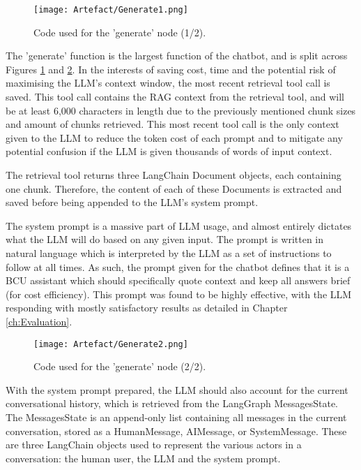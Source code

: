 \begin{figure}[H]
    \centering
    \texttt{[image: Artefact/Generate1.png]}
    \caption{Code used for the 'generate' node (1/2). \label{fig:Generate1}}
\end{figure}

\noindent The 'generate' function is the largest function of the chatbot, and is split across 
Figures \ref{fig:Generate1} and \ref{fig:Generate2}. In the interests of saving 
cost, time and the potential risk of maximising the LLM's context window, the most recent retrieval tool 
call is saved. This tool call contains the RAG context from the retrieval tool, and will be at least 
6,000 characters in length due to the previously mentioned chunk sizes and amount of chunks retrieved.
This most recent tool call is the only context given to the LLM to reduce the token cost of each prompt 
and to mitigate any potential confusion if the LLM is given thousands of words of input context.

\para The retrieval tool returns three LangChain Document objects, each containing one chunk.  
Therefore, the content of each of these Documents is extracted and saved before being appended to the 
LLM's system prompt.

\para The system prompt is a massive part of LLM usage, and almost entirely dictates what the LLM will do 
based on any given input. The prompt is written in natural language which is interpreted by the LLM as a set 
of instructions to follow at all times. As such, the prompt given for the chatbot defines that it is 
a BCU assistant which should specifically quote context and keep all answers brief (for cost efficiency).
This prompt was found to be highly effective, with the LLM responding with mostly satisfactory results as 
detailed in Chapter \ref{ch:Evaluation}.

\begin{figure}[H]
    \centering
    \texttt{[image: Artefact/Generate2.png]}
    \caption{Code used for the 'generate' node (2/2). \label{fig:Generate2}}
\end{figure}

\noindent With the system prompt prepared, the LLM should also account for the current conversational 
history, which is retrieved from the LangGraph MessagesState. The MessagesState is an append-only list 
containing all messages in the current conversation, stored as a HumanMessage, AIMessage, or SystemMessage.
These are three LangChain objects used to represent the various actors in a conversation: the human user,
the LLM and the system prompt.

